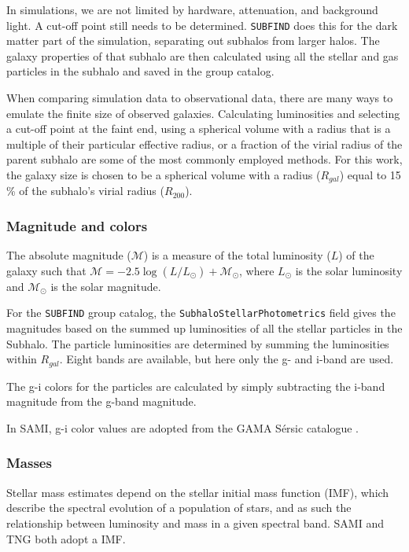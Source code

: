 In simulations, we are not limited by hardware, attenuation, and background light. A cut-off point still needs to be determined. \texttt{SUBFIND} does this for the dark matter part of the simulation, separating out subhalos from larger halos. The galaxy properties of that subhalo are then calculated using all the stellar and gas particles in the subhalo and saved in the group catalog. 


When comparing simulation data to observational data, there are many ways to emulate the finite size of observed galaxies. Calculating luminosities and selecting a cut-off point at the faint end, using a spherical volume with a radius that is a multiple of their particular effective radius, or a fraction of the virial radius of the parent subhalo are some of the most commonly employed methods. For this work, the galaxy size is chosen to be a spherical volume with a radius ($R_{gal}$) equal to 15 \% of the subhalo's virial radius ($R_{200}$).

\subsubsection{Magnitude and colors}

The absolute magnitude ($\mathcal{M}$) is a measure of the total luminosity ($L$) of the galaxy such that $\mathcal{M} = -2.5 \log(L/L_\odot) + \mathcal{M}_\odot$, where $L_\odot$ is the solar luminosity and $\mathcal{M}_\odot$ is the solar magnitude.

For the \texttt{SUBFIND} group catalog, the \texttt{SubhaloStellarPhotometrics} field gives the magnitudes based on the summed up luminosities of all the stellar particles in the Subhalo. The particle luminosities are determined by summing the luminosities within $R_{gal}$. Eight bands are available, but here only the g- and i-band are used. 

The g-i colors for the particles are calculated by simply subtracting the i-band magnitude from the g-band magnitude.

In SAMI, g-i color values are adopted from the GAMA Sérsic catalogue \parencite{Driver2011}.

\subsubsection{Masses}

Stellar mass estimates depend on the stellar initial mass function (IMF), which describe the spectral evolution of a population of stars, and as such the relationship between luminosity and mass in a given spectral band. SAMI and TNG both adopt a \textcite{Chabrier2003} IMF.

